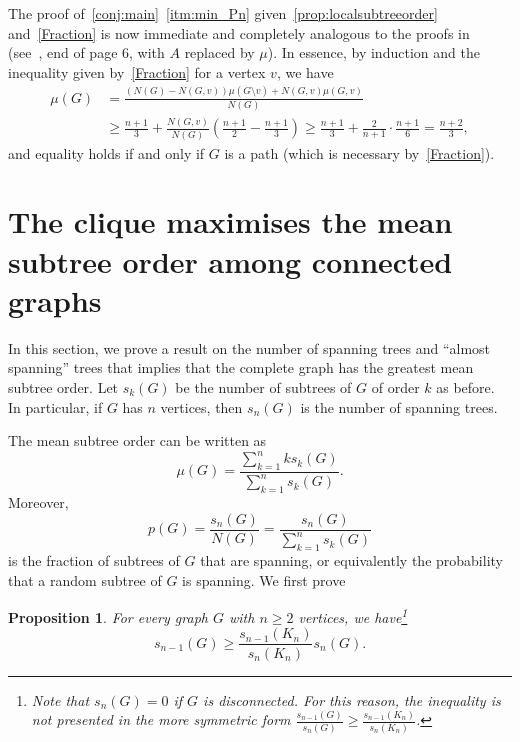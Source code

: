 \documentclass[11pt]{article}
\newtheorem{prop}[thr]{Proposition}
\theoremstyle{definition}
\begin{document}
The proof of~\cref{conj:main}~\ref{itm:min_Pn} given~\cref{prop:localsubtreeorder} and~\cref{Fraction} is now immediate and completely analogous to the proofs in~\cite{John22,Vince22} (see~\cite[Proof of Theorem 1]{John22}, end of page 6, with $A$ replaced by $\mu$).
In essence, by induction and the inequality given by~\cref{Fraction} for a vertex $v$, we have
\begin{align*}
    \mu(G) &=\frac{(N(G)-N(G,v))\mu(G \setminus v) + N(G,v)\mu(G,v)}{N(G)} \\
    &\ge \frac{n+1}{3}+\frac{N(G,v)}{N(G)}\left(\frac{n+1}2-\frac{n+1}{3}\right) \ge\frac{n+1}{3}+\frac{2}{n+1}\cdot\frac{n+1}{6}=\frac{n+2}{3},
\end{align*}
and equality holds if and only if $G$ is a path (which is necessary by~\cref{Fraction}).



\section{The clique maximises the mean subtree order among connected graphs}
\label{sec:maximum_Kn}

In this section, we prove a result on the number of spanning trees and ``almost spanning'' trees that implies that the complete graph has the greatest mean subtree order. Let $s_k(G)$ be the number of subtrees of $G$ of order $k$ as before. In particular, if $G$ has $n$ vertices, then $s_n(G)$ is the number of spanning trees.
    
The mean subtree order can be written as
$$\mu(G) = \frac{\sum_{k=1}^n k s_k(G)}{\sum_{k=1}^n s_k(G)}.$$
Moreover, 
$$p(G)=\frac{ s_n(G)}{N(G)}=\frac{ s_n(G)}{ \sum_{k=1}^n s_k(G)}$$ is the fraction of subtrees of $G$ that are spanning, or equivalently the probability that a random subtree of $G$ is spanning. 
We first prove 

\begin{prop}\label{conj1}
For every graph $G$ with $n\ge 2$ vertices, we have\footnote{Note that $s_n(G) = 0$ if $G$ is disconnected. For this reason, the inequality is not presented in the more symmetric form $\frac{s_{n-1}(G)}{s_n(G)} \ge \frac{s_{n-1}(K_n)}{s_n(K_n)}$.}
$$s_{n-1}(G) \ge \frac{s_{n-1}(K_n)}{s_n(K_n)} s_n(G).$$
\end{prop}
\end{document}
